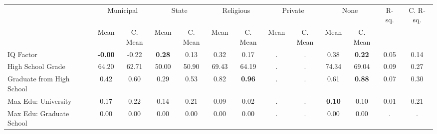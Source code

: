 \begin{tabular}{l c c c c c c c c c c c c}
\toprule
& \multicolumn{2}{c}{Municipal} & \multicolumn{2}{c}{State} & \multicolumn{2}{c}{Religious} & \multicolumn{2}{c}{Private} & \multicolumn{2}{c}{None} & R-sq. & C. R-sq. \\
& \scriptsize Mean & \scriptsize C. Mean & \scriptsize Mean & \scriptsize C. Mean & \scriptsize Mean & \scriptsize C. Mean & \scriptsize Mean & \scriptsize C. Mean & \scriptsize Mean & \scriptsize C. Mean & & \\
\midrule
IQ Factor & \textbf{    -0.00} & -0.22 & \textbf{     0.28} & 0.13 &      0.32 & 0.17 &         . & . &      0.38 & \textbf{     0.22} &      0.05 &      0.14 \\
High School Grade &     64.20 & 62.71 &     50.00 & 50.90 &     69.43 & 64.19 &         . & . &     74.34 & 69.04 &      0.09 &      0.27 \\
Graduate from High School &      0.42 & 0.60 &      0.29 & 0.53 &      0.82 & \textbf{     0.96} &         . & . &      0.61 & \textbf{     0.88} &      0.07 &      0.30 \\
Max Edu: University &      0.17 & 0.22 &      0.14 & 0.21 &      0.09 & 0.02 &         . & . & \textbf{     0.10} & 0.10 &      0.01 &      0.21 \\
Max Edu: Graduate School &      0.00 & 0.00 &      0.00 & 0.00 &      0.00 & 0.00 &         . & . &      0.00 & 0.00 &         . &         . \\
\bottomrule
\end{tabular}

